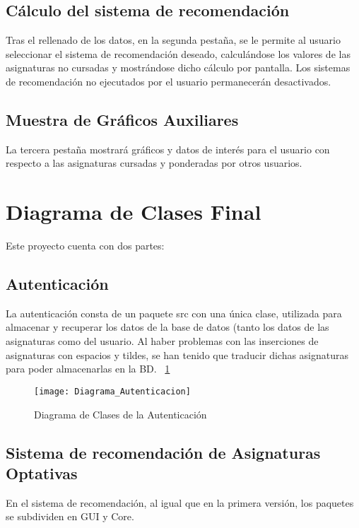 \subsection{Cálculo del sistema de recomendación}
Tras el rellenado de los datos, en la segunda pestaña, se le permite al usuario seleccionar el sistema de recomendación deseado, calculándose los valores de las asignaturas no cursadas y mostrándose dicho cálculo por pantalla. Los sistemas de recomendación no ejecutados por el usuario permanecerán desactivados. 
\subsection{Muestra de Gráficos Auxiliares}
La tercera pestaña mostrará gráficos y datos de interés para el usuario con respecto a las asignaturas cursadas y ponderadas por otros usuarios. 


\section{Diagrama de Clases Final}
Este proyecto cuenta con dos partes: 
\subsection{Autenticación}
La autenticación consta de un paquete src con una única clase, utilizada para almacenar y recuperar los datos de la base de datos (tanto los datos de las asignaturas como del usuario. 
Al haber problemas con las inserciones de asignaturas con espacios y tildes, se han tenido que traducir dichas asignaturas para poder almacenarlas en la BD. ~\ref{fig:C.4.1}
\begin{figure}[h]
\centering
\texttt{[image: Diagrama\_Autenticacion]}
\caption{Diagrama de Clases de la Autenticación}
\label{fig:C.4.1}
\end{figure}

\subsection{Sistema de recomendación de Asignaturas Optativas}
En el sistema de recomendación, al igual que en la primera versión, los paquetes se subdividen en GUI y Core. 

